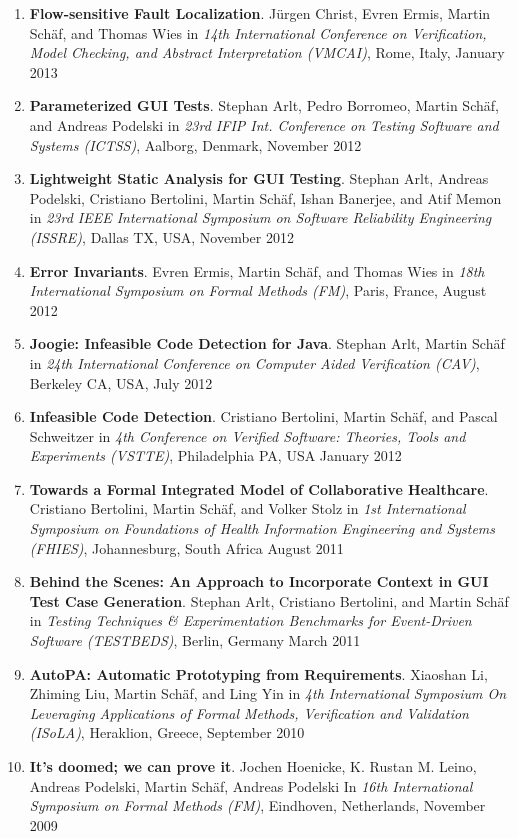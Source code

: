 \begin{enumerate}
\item \textbf{Flow-sensitive Fault Localization}.  J\"urgen Christ, Evren Ermis, Martin Sch\"af, 
and Thomas Wies in \emph{14th International Conference on Verification, Model Checking, and 
Abstract Interpretation (VMCAI)}, Rome, Italy, January 2013

\item \textbf{Parameterized GUI Tests}. Stephan
Arlt, Pedro Borromeo,  Martin Sch\"af, and Andreas Podelski  in \emph{ 23rd
IFIP Int. Conference on Testing Software and Systems (ICTSS)}, Aalborg, Denmark,
November 2012

  
\item \textbf{Lightweight Static Analysis for GUI Testing}. Stephan
Arlt, Andreas Podelski, Cristiano Bertolini, Martin Sch\"af, Ishan Banerjee, and
Atif Memon in \emph{ 23rd IEEE International Symposium on Software Reliability
Engineering (ISSRE)}, Dallas TX, USA, November 2012


\item \textbf{Error Invariants}. Evren Ermis, Martin Sch\"af, and Thomas Wies in
\emph{18th International Symposium on Formal Methods (FM)}, Paris, France,
August 2012

\item \textbf{Joogie: Infeasible Code Detection for Java}. Stephan Arlt, Martin
Sch\"af in \emph{24th International Conference on Computer Aided Verification
(CAV)}, Berkeley CA, USA, July 2012

\item \textbf{Infeasible Code Detection}. Cristiano Bertolini, Martin
Sch\"af, and Pascal Schweitzer in \emph{4th Conference on Verified Software:
Theories, Tools and Experiments (VSTTE)}, Philadelphia PA, USA January 2012

\item \textbf{Towards a Formal Integrated Model of Collaborative Healthcare}.
Cristiano Bertolini, Martin Sch\"af, and Volker Stolz  in \emph{1st International Symposium on 
Foundations of Health Information Engineering and Systems (FHIES)}, Johannesburg, South Africa
August 2011

\item \textbf{Behind the Scenes: An Approach to Incorporate Context in GUI Test
Case Generation}. Stephan Arlt, Cristiano Bertolini, and Martin Sch\"af  in \emph{Testing Techniques \& Experimentation Benchmarks
for Event-Driven Software (TESTBEDS)}, Berlin, Germany
March 2011

\item \textbf{AutoPA: Automatic Prototyping from Requirements}. Xiaoshan Li,
Zhiming Liu, Martin Sch\"af, and Ling Yin in \emph{4th International Symposium On Leveraging Applications of Formal Methods, Verification and Validation (ISoLA)}, Heraklion, Greece,
September 2010

\item \textbf{It's doomed; we can prove it}. Jochen Hoenicke, K. Rustan M.
Leino, Andreas Podelski, Martin Sch\"af, Andreas Podelski In
\emph{16th International Symposium on Formal Methods (FM)}, Eindhoven, Netherlands,
November 2009
  
\setcounter{saveenum}{\value{enumi}}
\end{enumerate}
